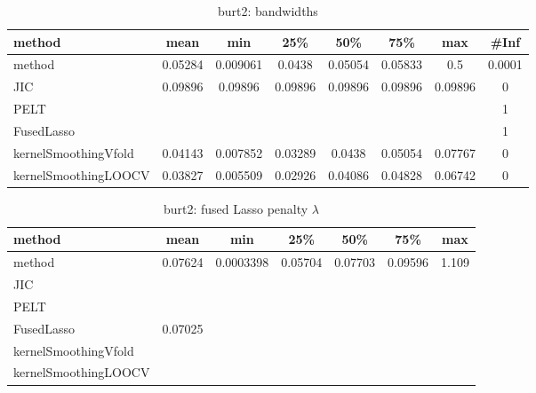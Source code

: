 \begin{table}[ht]
\centering
\begin{tabular}{l|c|ccccc|c}
  \hline
method & mean & min & 25\% & 50\% & 75\% & max & \#Inf \\ 
  \hline
method & 0.05284 & 0.009061 & 0.0438 & 0.05054 & 0.05833 &   0.5 & 0.0001 \\ 
  JIC & 0.09896 & 0.09896 & 0.09896 & 0.09896 & 0.09896 & 0.09896 &   0 \\ 
  PELT &  &  &  &  &  &  &   1 \\ 
  FusedLasso &  &  &  &  &  &  &   1 \\ 
  kernelSmoothingVfold & 0.04143 & 0.007852 & 0.03289 & 0.0438 & 0.05054 & 0.07767 &   0 \\ 
  kernelSmoothingLOOCV & 0.03827 & 0.005509 & 0.02926 & 0.04086 & 0.04828 & 0.06742 &   0 \\ 
   \hline
\end{tabular}
\caption{burt2: bandwidths} 
\label{tab:burt2Bandwidths}
\end{table}
\begin{table}[ht]
\centering
\begin{tabular}{l|c|ccccc}
  \hline
method & mean & min & 25\% & 50\% & 75\% & max \\ 
  \hline
method & 0.07624 & 0.0003398 & 0.05704 & 0.07703 & 0.09596 & 1.109 \\ 
  JIC &  &  &  &  &  &  \\ 
  PELT &  &  &  &  &  &  \\ 
  FusedLasso & 0.07025 &  &  &  &  &  \\ 
  kernelSmoothingVfold &  &  &  &  &  &  \\ 
  kernelSmoothingLOOCV &  &  &  &  &  &  \\ 
   \hline
\end{tabular}
\caption{burt2: fused Lasso penalty $\lambda$} 
\label{tab:burt2Lambdas}
\end{table}

